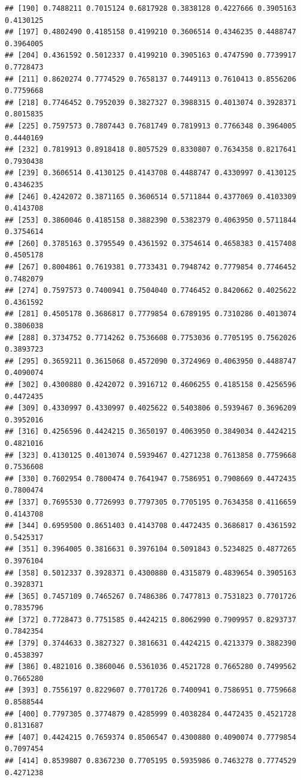 \documentclass[
  american,
  man,floatsintext]{apa7}
\begin{document}
\begin{verbatim}
## [190] 0.7488211 0.7015124 0.6817928 0.3838128 0.4227666 0.3905163 0.4130125
## [197] 0.4802490 0.4185158 0.4199210 0.3606514 0.4346235 0.4488747 0.3964005
## [204] 0.4361592 0.5012337 0.4199210 0.3905163 0.4747590 0.7739917 0.7728473
## [211] 0.8620274 0.7774529 0.7658137 0.7449113 0.7610413 0.8556206 0.7759668
## [218] 0.7746452 0.7952039 0.3827327 0.3988315 0.4013074 0.3928371 0.8015835
## [225] 0.7597573 0.7807443 0.7681749 0.7819913 0.7766348 0.3964005 0.4440169
## [232] 0.7819913 0.8918418 0.8057529 0.8330807 0.7634358 0.8217641 0.7930438
## [239] 0.3606514 0.4130125 0.4143708 0.4488747 0.4330997 0.4130125 0.4346235
## [246] 0.4242072 0.3871165 0.3606514 0.5711844 0.4377069 0.4103309 0.4143708
## [253] 0.3860046 0.4185158 0.3882390 0.5382379 0.4063950 0.5711844 0.3754614
## [260] 0.3785163 0.3795549 0.4361592 0.3754614 0.4658383 0.4157408 0.4505178
## [267] 0.8004861 0.7619381 0.7733431 0.7948742 0.7779854 0.7746452 0.7482079
## [274] 0.7597573 0.7400941 0.7504040 0.7746452 0.8420662 0.4025622 0.4361592
## [281] 0.4505178 0.3686817 0.7779854 0.6789195 0.7310286 0.4013074 0.3806038
## [288] 0.3734752 0.7714262 0.7536608 0.7753036 0.7705195 0.7562026 0.3893723
## [295] 0.3659211 0.3615068 0.4572090 0.3724969 0.4063950 0.4488747 0.4090074
## [302] 0.4300880 0.4242072 0.3916712 0.4606255 0.4185158 0.4256596 0.4472435
## [309] 0.4330997 0.4330997 0.4025622 0.5403806 0.5939467 0.3696209 0.3952016
## [316] 0.4256596 0.4424215 0.3650197 0.4063950 0.3849034 0.4424215 0.4821016
## [323] 0.4130125 0.4013074 0.5939467 0.4271238 0.7613858 0.7759668 0.7536608
## [330] 0.7602954 0.7800474 0.7641947 0.7586951 0.7908669 0.4472435 0.7800474
## [337] 0.7695530 0.7726993 0.7797305 0.7705195 0.7634358 0.4116659 0.4143708
## [344] 0.6959500 0.8651403 0.4143708 0.4472435 0.3686817 0.4361592 0.5425317
## [351] 0.3964005 0.3816631 0.3976104 0.5091843 0.5234825 0.4877265 0.3976104
## [358] 0.5012337 0.3928371 0.4300880 0.4315879 0.4839654 0.3905163 0.3928371
## [365] 0.7457109 0.7465267 0.7486386 0.7477813 0.7531823 0.7701726 0.7835796
## [372] 0.7728473 0.7751585 0.4424215 0.8062990 0.7909957 0.8293737 0.7842354
## [379] 0.3744633 0.3827327 0.3816631 0.4424215 0.4213379 0.3882390 0.4538397
## [386] 0.4821016 0.3860046 0.5361036 0.4521728 0.7665280 0.7499562 0.7665280
## [393] 0.7556197 0.8229607 0.7701726 0.7400941 0.7586951 0.7759668 0.8588544
## [400] 0.7797305 0.3774879 0.4285999 0.4038284 0.4472435 0.4521728 0.8131687
## [407] 0.4424215 0.7659374 0.8506547 0.4300880 0.4090074 0.7779854 0.7097454
## [414] 0.8539807 0.8367230 0.7705195 0.5935986 0.7463278 0.7774529 0.4271238

\end{verbatim}
\end{document}
